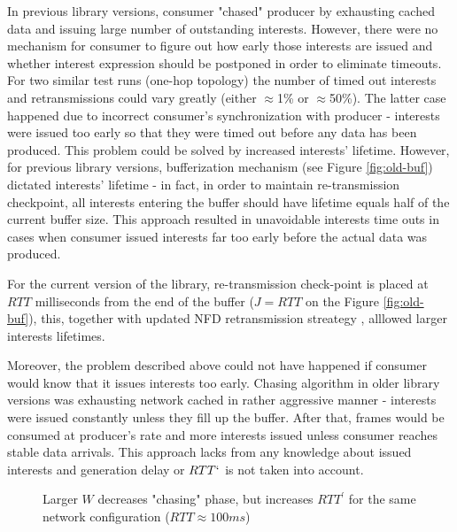 \documentclass{icn/sig-alternate-2012} %
\begin{document}
In previous library versions, consumer "chased" producer by exhausting cached data and issuing large number of outstanding interests. However, there were no mechanism for consumer to figure out how early those interests are issued and whether interest expression should be postponed in order to eliminate timeouts. For two similar test runs (one-hop topology) the number of timed out interests and retransmissions could vary greatly (either $\approx$1\% or $\approx$50\%). The latter case happened due to incorrect consumer's synchronization with producer - interests were issued too early so that they were timed out before any data has been produced. This problem could be solved by increased interests' lifetime. However, for previous library versions, bufferization mechanism (see Figure \ref{fig:old-buf}) dictated interests' lifetime - in fact, in order to maintain re-transmission checkpoint, all interests entering the buffer should have lifetime equals half of the current buffer size. This approach resulted in unavoidable interests time outs in cases when consumer issued interests far too early before the actual data was produced.

For the current version of the library, re-transmission check-point is placed at $RTT$ milliseconds from the end of the buffer ($J=RTT$ on the Figure \ref{fig:old-buf}), this, together with updated NFD retransmission streategy \cite{nfd-rtx}, alllowed larger interests lifetimes.

Moreover, the problem described above could not have happened if consumer would know that it issues interests too early. Chasing algorithm in older library versions was exhausting network cached in rather aggressive manner - interests were issued constantly unless they fill up the buffer. After that, frames would be consumed at producer's rate and more interests issued unless consumer reaches stable data arrivals. This approach lacks from any knowledge about issued interests and generation delay or $RTT`$ is not taken into account.

\begin{figure}[t!]
\centering
\begin{scriptsize}
\end{scriptsize}
\caption{Larger $W$ decreases "chasing" phase, but increases $RTT^\prime$ for the same network configuration ($RTT\approx100ms$)}
\label{fig:ws}
\end{figure}
\end{document}
